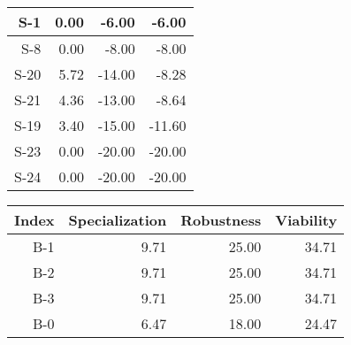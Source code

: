 \begin{tabular}{ | r | r | r | r | }
    \hline
                   S-1  &            0.00  &           -6.00  &           -6.00  \\
    \hline
                   S-8  &            0.00  &           -8.00  &           -8.00  \\
    \hline
                  S-20  &            5.72  &          -14.00  &           -8.28  \\
    \hline
                  S-21  &            4.36  &          -13.00  &           -8.64  \\
    \hline
                  S-19  &            3.40  &          -15.00  &          -11.60  \\
    \hline
                  S-23  &            0.00  &          -20.00  &          -20.00  \\
    \hline
                  S-24  &            0.00  &          -20.00  &          -20.00  \\
    \hline
\end{tabular}


\begin{tabular}{ | r | r | r | r | }
    \hline
                 Index  &  Specialization  &      Robustness  &       Viability  \\
    \hline
    \hline
                   B-1  &            9.71  &           25.00  &           34.71  \\
    \hline
                   B-2  &            9.71  &           25.00  &           34.71  \\
    \hline
                   B-3  &            9.71  &           25.00  &           34.71  \\
    \hline
                   B-0  &            6.47  &           18.00  &           24.47  \\
    \hline
\end{tabular}



